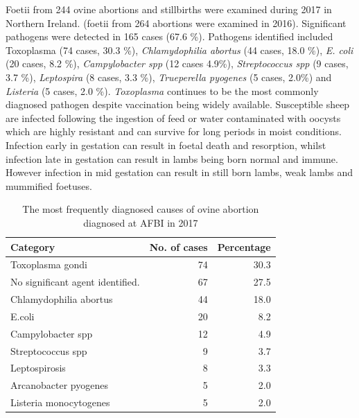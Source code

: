 \documentclass[]{book}
\begin{document}
Foetii from 244 ovine abortions and stillbirths were examined during
2017 in Northern Ireland. (foetii from 264 abortions were examined in
2016). Significant pathogens were detected in 165 cases (67.6 \%).
Pathogens identified included Toxoplasma (74 cases, 30.3 \%),
\emph{Chlamydophilia abortus} (44 cases, 18.0 \%), \emph{E. coli} (20
cases, 8.2 \%), \emph{Campylobacter spp} (12 cases 4.9\%),
\emph{Streptococcus spp} (9 cases, 3.7 \%), \emph{Leptospira} (8 cases,
3.3 \%), \emph{Trueperella pyogenes} (5 cases, 2.0\%) and
\emph{Listeria} (5 cases, 2.0 \%). \emph{Toxoplasma} continues to be the
most commonly diagnosed pathogen despite vaccination being widely
available. Susceptible sheep are infected following the ingestion of
feed or water contaminated with oocysts which are highly resistant and
can survive for long periods in moist conditions. Infection early in
gestation can result in foetal death and resorption, whilst infection
late in gestation can result in lambs being born normal and immune.
However infection in mid gestation can result in still born lambs, weak
lambs and mummified foetuses.

\begin{table}

\caption{\label{tab:unnamed-chunk-110}The most frequently diagnosed causes of ovine abortion diagnosed at AFBI in 2017}
\centering
\begin{tabular}[t]{l|r|r}
\hline
Category & No. of cases & Percentage\\
\hline
Toxoplasma gondi & 74 & 30.3\\
\hline
No significant agent identified. & 67 & 27.5\\
\hline
Chlamydophilia abortus & 44 & 18.0\\
\hline
E.coli & 20 & 8.2\\
\hline
Campylobacter spp & 12 & 4.9\\
\hline
Streptococcus spp & 9 & 3.7\\
\hline
Leptospirosis & 8 & 3.3\\
\hline
Arcanobacter pyogenes & 5 & 2.0\\
\hline
Listeria monocytogenes & 5 & 2.0\\
\hline
\end{tabular}
\end{table}
\end{document}

